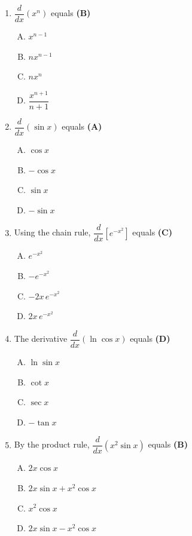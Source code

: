 \documentclass[10pt,a4paper]{article}
\begin{document}
\begin{enumerate}[1.]

\item $\dfrac{d}{dx}(x^n)$ equals \hfill \textbf{(B)}
\begin{enumerate}[(A)]
    \item $x^{n-1}$
    \item $nx^{n-1}$
    \item $nx^n$
    \item $\dfrac{x^{n+1}}{n+1}$
\end{enumerate}

\item $\dfrac{d}{dx}(\sin x)$ equals \hfill \textbf{(A)}
\begin{enumerate}[(A)]
    \item $\cos x$
    \item $-\cos x$
    \item $\sin x$
    \item $-\sin x$
\end{enumerate}

\item Using the chain rule, $\dfrac{d}{dx}\!\left[e^{-x^2}\right]$ equals \hfill \textbf{(C)}
\begin{enumerate}[(A)]
    \item $e^{-x^2}$
    \item $-e^{-x^2}$
    \item $-2x\,e^{-x^2}$
    \item $2x\,e^{-x^2}$
\end{enumerate}

\item The derivative $\dfrac{d}{dx}(\ln\cos x)$ equals \hfill \textbf{(D)}
\begin{enumerate}[(A)]
    \item $\ln\sin x$
    \item $\cot x$
    \item $\sec x$
    \item $-\tan x$
\end{enumerate}

\item By the product rule, $\dfrac{d}{dx}(x^2\sin x)$ equals \hfill \textbf{(B)}
\begin{enumerate}[(A)]
    \item $2x\cos x$
    \item $2x\sin x + x^2\cos x$
    \item $x^2\cos x$
    \item $2x\sin x - x^2\cos x$
\end{enumerate}


\end{enumerate}
\end{document}
